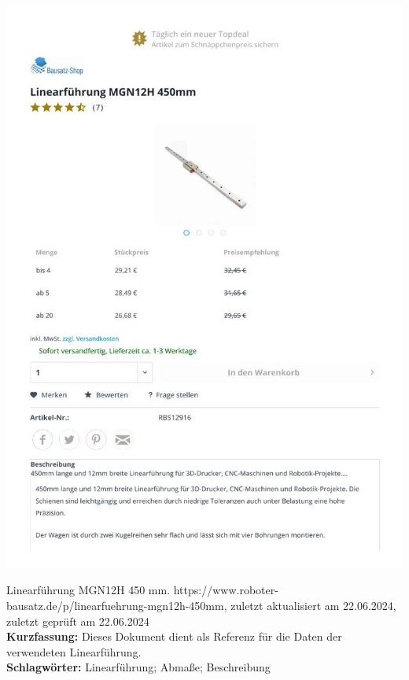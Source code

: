 {
	\begin{minipage}{0.38\textwidth}
		\includegraphics[width=\linewidth]{images/Robotor.jpg}
	\end{minipage}
	\hfill
	\begin{minipage}{0.6\textwidth}
		Linearführung MGN12H 450 mm. https://www.roboter-bausatz.de/p/linearfuehrung-mgn12h-450mm, zuletzt aktualisiert am 22.06.2024, zuletzt geprüft am 22.06.2024
		\\ \textbf{Kurzfassung:} Dieses Dokument dient als Referenz für die Daten der verwendeten Linearführung. 
		\\ \textbf{Schlagwörter:} Linearführung; Abmaße; Beschreibung
	\end{minipage}
}


